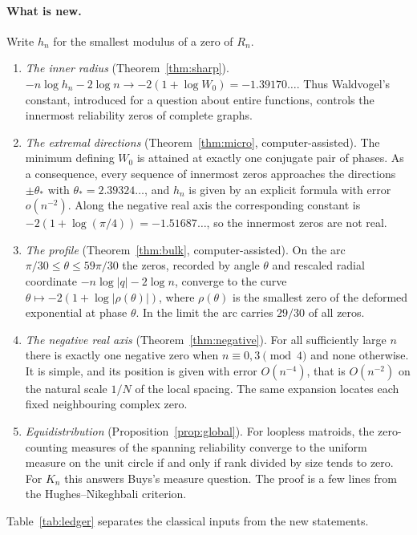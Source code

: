 \documentclass[11pt,a4paper]{article}
\theoremstyle{remark}
\begin{document}
\paragraph{What is new.} Write $h_n$ for the smallest modulus of a zero of $R_n$.
\begin{enumerate}
\item \emph{The inner radius} (Theorem~\ref{thm:sharp}). $-n\log h_n-2\log n\to-2(1+\log W_0)=-1.39170\ldots$. Thus Waldvogel's constant, introduced for a question about entire functions, controls the innermost reliability zeros of complete graphs.
\item \emph{The extremal directions} (Theorem~\ref{thm:micro}, computer-assisted). The minimum defining $W_0$ is attained at exactly one conjugate pair of phases. As a consequence, every sequence of innermost zeros approaches the directions $\pm\theta_*$ with $\theta_*=2.39324\ldots$, and $h_n$ is given by an explicit formula with error $o(n^{-2})$. Along the negative real axis the corresponding constant is $-2(1+\log(\pi/4))=-1.51687\ldots$, so the innermost zeros are not real.
\item \emph{The profile} (Theorem~\ref{thm:bulk}, computer-assisted). On the arc $\pi/30\le\theta\le59\pi/30$ the zeros, recorded by angle $\theta$ and rescaled radial coordinate $-n\log|q|-2\log n$, converge to the curve $\theta\mapsto-2(1+\log|\rho(\theta)|)$, where $\rho(\theta)$ is the smallest zero of the deformed exponential at phase $\theta$. In the limit the arc carries $29/30$ of all zeros.
\item \emph{The negative real axis} (Theorem~\ref{thm:negative}). For all sufficiently large $n$ there is exactly one negative zero when $n\equiv0,3\pmod4$ and none otherwise. It is simple, and its position is given with error $O(n^{-4})$, that is $O(n^{-2})$ on the natural scale $1/N$ of the local spacing. The same expansion locates each fixed neighbouring complex zero.
\item \emph{Equidistribution} (Proposition~\ref{prop:global}). For loopless matroids, the zero-counting measures of the spanning reliability converge to the uniform measure on the unit circle if and only if rank divided by size tends to zero. For $K_n$ this answers Buys's measure question. The proof is a few lines from the Hughes--Nikeghbali criterion.
\end{enumerate}
Table~\ref{tab:ledger} separates the classical inputs from the new statements.
\end{document}

